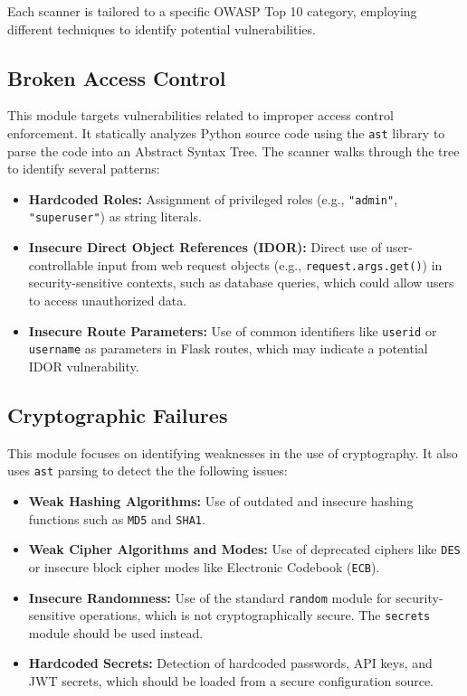 Each scanner is tailored to a specific OWASP Top 10 category, employing different techniques to identify potential vulnerabilities. 

\subsection{Broken Access Control}
This module targets vulnerabilities related to improper access control enforcement. It statically analyzes Python source code using the \texttt{ast} library to parse the code into an Abstract Syntax Tree. The scanner walks through the tree to identify several patterns:
\begin{itemize}
    \item \textbf{Hardcoded Roles:} Assignment of privileged roles (e.g., \texttt{"admin"}, \texttt{"superuser"}) as string literals.
    \item \textbf{Insecure Direct Object References (IDOR):} Direct use of user-controllable input from web request objects (e.g., \texttt{request.args.get()}) in security-sensitive contexts, such as database queries, which could allow users to access unauthorized data.
    \item \textbf{Insecure Route Parameters:} Use of common identifiers like \texttt{userid} or \texttt{username} as parameters in Flask routes, which may indicate a potential IDOR vulnerability.
\end{itemize}

\subsection{Cryptographic Failures}
This module focuses on identifying weaknesses in the use of cryptography. It also uses \texttt{ast} parsing to detect the the following issues:
\begin{itemize}
    \item \textbf{Weak Hashing Algorithms:} Use of outdated and insecure hashing functions such as \texttt{MD5} and \texttt{SHA1}.
    \item \textbf{Weak Cipher Algorithms and Modes:} Use of deprecated ciphers like \texttt{DES} or insecure block cipher modes like Electronic Codebook (\texttt{ECB}).
    \item \textbf{Insecure Randomness:} Use of the standard \texttt{random} module for security-sensitive operations, which is not cryptographically secure. The \texttt{secrets} module should be used instead.
    \item \textbf{Hardcoded Secrets:} Detection of hardcoded passwords, API keys, and JWT secrets, which should be loaded from a secure configuration source.
\end{itemize}

